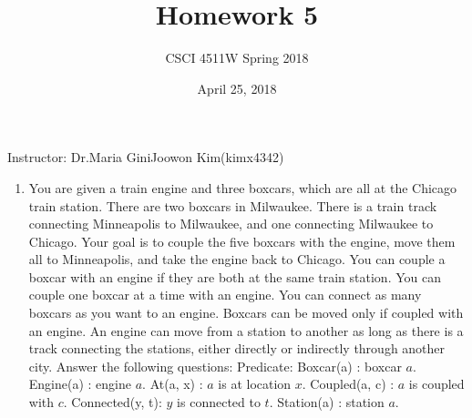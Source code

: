 \documentclass[10pt]{article}
\title{Homework 5}
\author{CSCI 4511W Spring 2018}
\begin{document}
\date{April 25, 2018}
\maketitle

Instructor: Dr.Maria Gini\hfill Joowon Kim(kimx4342)

\hrulefill

\begin{enumerate}
\item You are given a train engine and three boxcars, which are all at the Chicago train station. There are two boxcars in Milwaukee. There is a train track connecting Minneapolis to Milwaukee, and one connecting Milwaukee to Chicago. 
Your goal is to couple the five boxcars with the engine, move them all to Minneapolis, and take the engine back to Chicago. 
You can couple a boxcar with an engine if they are both at the same train station. You can couple one boxcar at a time with an engine. You can connect as many boxcars as you want to an engine. Boxcars can be moved only if coupled with an engine. An engine can move from a station to another as long as there is a track connecting the stations, either directly or indirectly through another city. 
Answer the following questions: \newline
\newline
Predicate: \newline
\newline
 Boxcar(a) : boxcar $a$. \newline
 Engine(a) : engine $a$. \newline
 At(a, x) : $a$ is at location $x$. \newline
 Coupled(a, c) : $a$ is coupled with $c$. \newline
 Connected(y, t): $y$ is connected to $t$. \newline
 Station(a) : station $a$. \newline


\end{enumerate}
\end{document}
